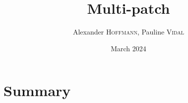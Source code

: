 \documentclass[10pt,a4paper]{article}
\title{Multi-patch}
\author{Alexander \textsc{Hoffmann}, Pauline \textsc{Vidal}}
\date{March 2024}
\begin{document}
\maketitle


\tableofcontents

\newpage



\section{Summary}



\end{document}
